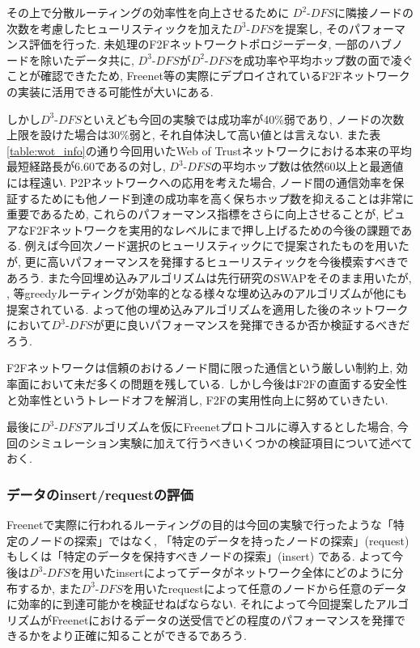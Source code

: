 \documentclass[dvipdfmx]{ampbt}
\begin{document}
その上で分散ルーティングの効率性を向上させるために $D^2$-$DFS$に隣接ノードの次数を考慮したヒューリスティックを加えた$D^3$-$DFS$を提案し, そのパフォーマンス評価を行った. 未処理のF2Fネットワークトポロジーデータ, 一部のハブノードを除いたデータ共に, $D^3$-$DFS$が$D^2$-$DFS$を成功率や平均ホップ数の面で凌ぐことが確認できたため, Freenet等の実際にデプロイされているF2Fネットワークの実装に活用できる可能性が大いにある. 

しかし$D^3$-$DFS$といえども今回の実験では成功率が40\%弱であり, ノードの次数上限を設けた場合は30\%弱と, それ自体決して高い値とは言えない. また表\ref{table:wot_info}の通り今回用いたWeb of Trustネットワークにおける本来の平均最短経路長が6.60であるの対し, $D^3$-$DFS$の平均ホップ数は依然60以上と最適値には程遠い. P2Pネットワークへの応用を考えた場合, ノード間の通信効率を保証するためにも他ノード到達の成功率を高く保ちホップ数を抑えることは非常に重要であるため, これらのパフォーマンス指標をさらに向上させることが, ピュアなF2Fネットワークを実用的なレベルにまで押し上げるための今後の課題である. 例えば今回次ノード選択のヒューリスティックに\cite{csimcsek2008navigating}で提案されたものを用いたが, 更に高いパフォーマンスを発揮するヒューリスティックを今後模索すべきであろう. また今回埋め込みアルゴリズムは先行研究のSWAPをそのまま用いたが, \cite{roos2017balanced}, \cite{boguna2010sustaining}等greedyルーティングが効率的となる様々な埋め込みのアルゴリズムが他にも提案されている. よって他の埋め込みアルゴリズムを適用した後のネットワークにおいて$D^3$-$DFS$が更に良いパフォーマンスを発揮できるか否か検証するべきだろう.

F2Fネットワークは信頼のおけるノード間に限った通信という厳しい制約上, 効率面において未だ多くの問題を残している. しかし今後はF2Fの直面する安全性と効率性というトレードオフを解消し, F2Fの実用性向上に努めていきたい. 

最後に$D^3$-$DFS$アルゴリズムを仮にFreenetプロトコルに導入するとした場合, 今回のシミュレーション実験に加えて行うべきいくつかの検証項目について述べておく.

\subsubsection*{データのinsert/requestの評価}
Freenetで実際に行われるルーティングの目的は今回の実験で行ったような「特定のノードの探索」ではなく, 「特定のデータを持ったノードの探索」(request) もしくは「特定のデータを保持すべきノードの探索」(insert) である. よって今後は$D^3$-$DFS$を用いたinsertによってデータがネットワーク全体にどのように分布するか, また$D^3$-$DFS$を用いたrequestによって任意のノードから任意のデータに効率的に到達可能かを検証せねばならない. それによって今回提案したアルゴリズムがFreenetにおけるデータの送受信でどの程度のパフォーマンスを発揮できるかをより正確に知ることができるであろう. 
\end{document}
